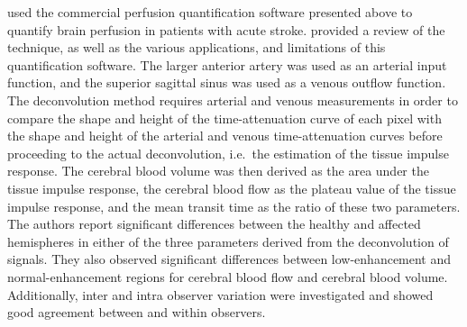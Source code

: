 \citet{Eastwood:2002hx} used the commercial perfusion quantification software presented above to quantify brain perfusion in patients with acute stroke.
\citet{Hoeffner:2004hq} provided a review of the technique, as well as the various applications, and limitations of this quantification software.
The larger anterior artery was used as an arterial input function, and the superior sagittal sinus was used as a venous outflow function.
The deconvolution method requires arterial and venous measurements in order to compare the shape and height of the time-attenuation curve of each pixel with the shape and height of the arterial and venous time-attenuation curves before proceeding to the actual deconvolution, i.e.~the estimation of the tissue impulse response.
The cerebral blood volume was then derived as the area under the tissue impulse response, the cerebral blood flow as the plateau value of the tissue impulse response, and the mean transit time as the ratio of these two parameters.
The authors report significant differences between the healthy and affected hemispheres in either of the three parameters derived from the deconvolution of signals.
They also observed significant differences between low-enhancement and normal-enhancement regions for cerebral blood flow and cerebral blood volume.
Additionally, inter and intra observer variation were investigated and showed good agreement between and within observers.

